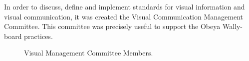 In order to discuss, define and implement standards for visual information and visual communication, it was created the Visual Communication Management Committee. This committee was precisely useful to support the Obeya Wally-board practices.
\begin{figure}[H] %
\caption{Visual Management Committee Members.}
\label{fig:VisualManagementCommitteMembers}
\end{figure}

